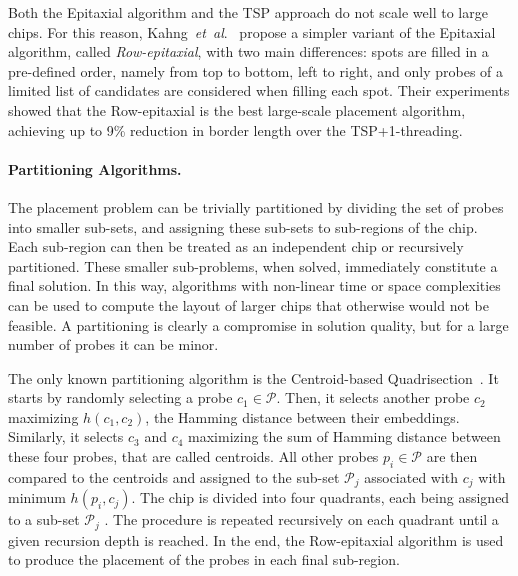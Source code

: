 \documentclass[runningheads]{llncs}
\newcommand{\ignore}[1]{}
\begin{document}
Both the Epitaxial algorithm and the TSP approach do not scale well to large
chips.  For this reason, Kahng~{\it et~al}.~\cite{KAHNG03A} propose a simpler variant
of the Epitaxial algorithm, called \emph{Row-epitaxial}, with two main
differences: spots are filled in a pre-defined order, namely
from top to bottom, left to right, and only probes of a limited list of candidates are
considered when filling each spot. Their experiments showed
that the Row-epitaxial is the best large-scale placement algorithm,
achieving up to 9\% reduction in border length over the TSP+1-threading.

\ignore{
The ever growing number of probes on the latest microarrays and the properties of
the placement problem naturally suggest the use of partitioning strategies to reduce
the running time of the algorithms.
}

\paragraph{Partitioning Algorithms.}
The placement problem can be trivially partitioned by
dividing the set of probes into smaller sub-sets, and assigning these sub-sets to
sub-regions of the chip. Each sub-region can then be treated as an independent chip
or recursively partitioned. These smaller sub-problems, when solved, immediately
constitute a final solution. In this way, algorithms with non-linear time or space
complexities can be used to compute the layout of larger chips that otherwise would not
be feasible. A partitioning is clearly a compromise in solution quality, but
for a large number of probes it can be minor.

The only known partitioning algorithm is the Centroid-based
Quadrisection~\cite{KAHNG03B}. It starts by randomly selecting a probe
$c_1 \in \mathcal{P}$. Then, it selects another probe $c_2$ maximizing
$h(c_1,c_2)$, the Hamming distance between their embeddings. Similarly, it selects
$c_3$ and $c_4$ maximizing the sum of Hamming distance between these four probes,
that are called centroids. All other probes
$p_i \in \mathcal{P}$ are then compared to the centroids and assigned to the sub-set
$\mathcal{P}_j$ associated with $c_j$ with minimum $h(p_i,c_j)$. The chip is divided
into four quadrants, each being assigned to a sub-set $\mathcal{P}_j$ .
The procedure is repeated
recursively on each quadrant until a given recursion depth is reached. In the end,
the Row-epitaxial algorithm is used to produce the placement of the probes in each
final sub-region.
\end{document}
